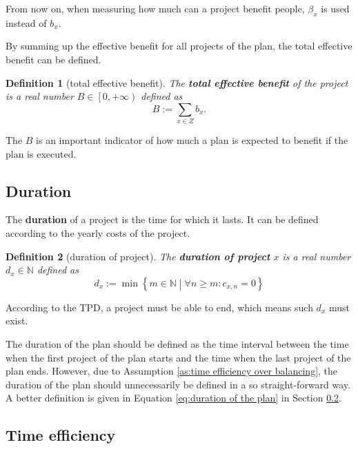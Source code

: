 \documentclass{article}
\newtheorem{definition}{Definition}
\begin{document}
From now on, when measuring how much can a project benefit people,
$\beta_x$ is used instead of $b_x$.

By summing up the effective benefit for all projects of the plan, the total effective benefit can be defined.

\begin{definition}[total effective benefit]
The \textbf{total effective benefit} of the project is a real number $B\in\left[0,+\infty\right)$ defined as
\begin{equation}
\label{eq:total effective benefit}
B:=\sum_{x\in Z}b_x.
\end{equation}
\end{definition}

The $B$ is an important indicator of how much a plan is expected to benefit if the plan is executed.

\subsection{Duration}
\label{sec:duration}

The \textbf{duration} of a project is the time for which it lasts.
It can be defined according to the yearly costs of the project.

\begin{definition}[duration of project]
The \textbf{duration of project} $x$ is a real number $d_x\in\mathbb N$ defined as
\begin{equation}
d_x:=\min\left\{m\in\mathbb N\middle|\forall n\ge m:c_{x,n}=0\right\}
\end{equation}
\end{definition}

According to the TPD, a project must be able to end, which means such $d_x$ must exist.

The duration of the plan should be defined as the time interval between the time when the first project of the plan starts and the time when the last project of the plan ends.
However, due to Assumption \ref{as:time efficiency over balancing}, the duration of the plan should unnecessarily be defined in a so straight-forward way.
A better definition is given in Equation \ref{eq:duration of the plan} in Section \ref{sec:time efficiency}.

\subsection{Time efficiency}
\label{sec:time efficiency}
\end{document}
